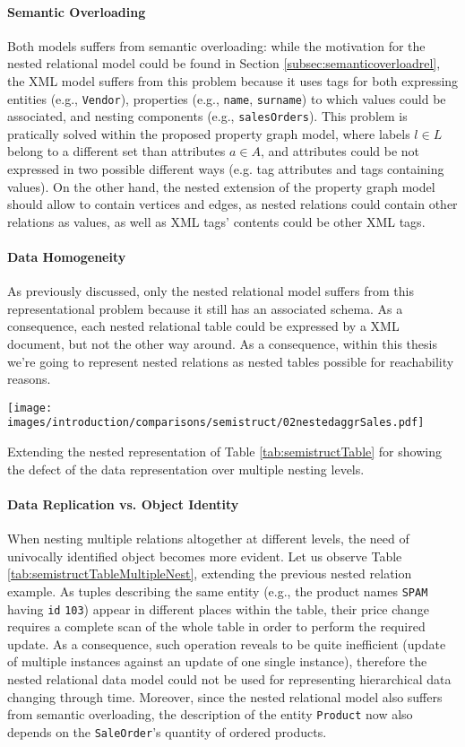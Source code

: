 \paragraph*{Semantic Overloading} Both models suffers from  semantic overloading: while the motivation for the nested relational model could be  found in Section \vref{subsec:semanticoverloadrel}, the XML model suffers from this problem because it uses tags for both expressing entities (e.g., \texttt{Vendor}), properties (e.g., \texttt{name}, \texttt{surname}) to which values could be associated, and nesting components (e.g., \texttt{salesOrders}). This problem is pratically solved within the proposed property graph model, where labels $l\in L$ belong to a different set than attributes $a\in A$, and attributes could be not expressed in two possible different ways (e.g. tag attributes and tags containing values). On the other hand, the nested extension of the property graph model should allow to contain vertices and edges, as nested relations could contain other relations as values, as well as XML tags' contents could be other XML tags.

\paragraph*{Data Homogeneity} As previously discussed, only the nested relational model suffers from this representational problem because it still has an associated schema. As a consequence, each nested relational table could be expressed by a XML document, but not the other way around. As a consequence, within this thesis we're going to represent nested relations as nested tables   possible for reachability reasons.


\begin{table}[!t]
\centering
\texttt{[image: images/introduction/comparisons/semistruct/02nestedaggrSales.pdf]}
\caption{Extending the nested representation of Table \ref{tab:semistructTable} for showing the defect of the data representation over multiple nesting levels.}
\label{tab:semistructTableMultipleNest}
\end{table}
\paragraph*{Data Replication vs. Object Identity}
When nesting multiple relations altogether at different levels, the need of univocally identified object becomes more evident. Let us observe Table \ref{tab:semistructTableMultipleNest}, extending the previous nested relation example. As  tuples describing the same entity (e.g., the product names \texttt{SPAM} having \texttt{id} \texttt{103}) appear in different places within the table, their price change requires a complete scan of the whole table in order to perform the required update. As a consequence, such operation reveals to be quite inefficient (update of multiple instances against an update of one single instance), therefore the nested relational data model could not be used for representing hierarchical data changing through time. Moreover, since the nested relational model also suffers from semantic overloading, the description of the entity \texttt{Product} now also depends on the \texttt{SaleOrder}'s quantity of ordered products.

